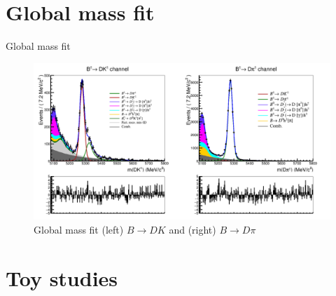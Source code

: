 \documentclass{beamer}
\begin{document}
\section{Global mass fit}
\begin{frame}{Global mass fit}
  \begin{figure}
    \centering
    \includegraphics[width = 1.0\textwidth]{GlobalFit.png}
    \caption{Global mass fit (left) $B\to DK$ and (right) $B\to D\pi$}
  \end{figure}
\end{frame}

\section{Toy studies}
\end{document}
